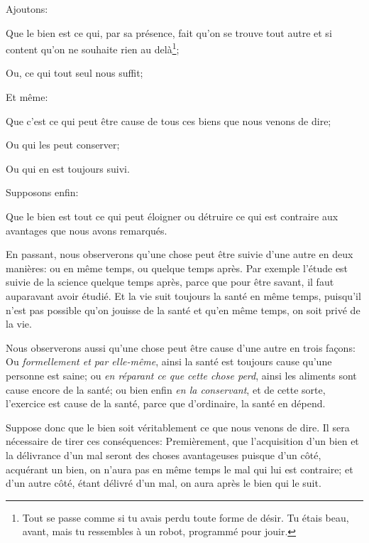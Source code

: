 Ajoutons:

\begin{emphpar}
	Que le bien est ce qui, par sa présence, fait qu'on se trouve tout autre et si content qu'on ne souhaite rien au
	delà\footnote{Tout se passe comme si tu avais perdu toute forme de désir. Tu étais beau, avant, mais tu ressembles
	à un robot, programmé pour jouir.};

	Ou, ce qui tout seul nous suffit;
\end{emphpar}

Et même:

\begin{emphpar}
	Que c'est ce qui peut être cause de tous ces biens que nous venons de dire;

	Ou qui les peut conserver;

	Ou qui en est toujours suivi.
\end{emphpar}

\bigbreak

Supposons enfin:

\begin{emphpar}
	Que le bien est tout ce qui peut éloigner ou détruire ce qui est contraire aux avantages que nous avons remarqués.
\end{emphpar}

En passant, nous observerons qu'une chose peut être suivie d'une autre en deux manières: ou en même temps, ou quelque temps
après. Par exemple l'étude est suivie de la science quelque temps après, parce que pour être savant, il faut auparavant
avoir étudié. Et la vie suit toujours la santé en même temps, puisqu'il n'est pas possible qu'on jouisse de la santé et
qu'en même temps, on soit privé de la vie.

Nous observerons aussi qu'une chose peut être cause d'une autre en trois façons: Ou \emph{formellement et par elle-même},
ainsi la santé est toujours cause qu'une personne est saine; ou \emph{en réparant ce que cette chose perd}, ainsi les
aliments sont cause encore de la santé; ou bien enfin \emph{en la conservant}, et de cette sorte, l'exercice est cause de
la santé, parce que d'ordinaire, la santé en dépend.

\bigbreak

Suppose donc que le bien soit véritablement ce que nous venons de dire. Il sera nécessaire de tirer ces conséquences:
Premièrement, que l'acquisition d'un bien et la délivrance d'un mal seront des choses avantageuses puisque d'un côté,
acquérant un bien, on n'aura pas en même temps le mal qui lui est contraire; et d'un autre côté, étant délivré d'un
mal, on aura après le bien qui le suit. 

